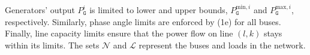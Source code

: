 Generators' output \( P_{\texttt{G}}^{i} \) is limited to lower and upper bounds, \( P_{\texttt{G}}^{\text{min},i} \) and \( P_{\texttt{G}}^{\text{max},i} \), respectively. Similarly, phase angle limits are enforced by (1e) for all buses. Finally, line capacity limits ensure that the power flow on line \( (l, k) \) stays within its limits.
%
The sets \( \mathcal{N} \) and \( \mathcal{L} \) represent the buses and loads in the network.


